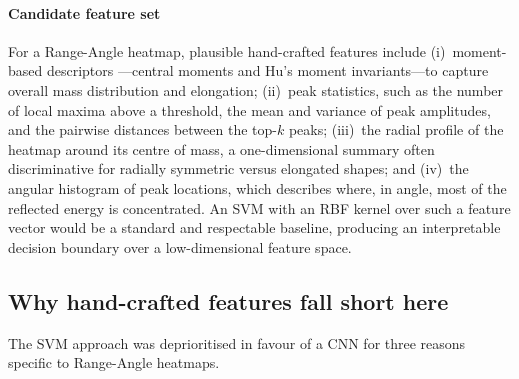 \documentclass[letterpaper,11pt,leqno]{article}
\begin{document}
\paragraph{Candidate feature set} For a Range-Angle heatmap, plausible hand-crafted features include (i)~moment-based descriptors \citep{Hu62}---central moments and Hu's moment invariants---to capture overall mass distribution and elongation; (ii)~peak statistics, such as the number of local maxima above a threshold, the mean and variance of peak amplitudes, and the pairwise distances between the top-$k$ peaks; (iii)~the radial profile of the heatmap around its centre of mass, a one-dimensional summary often discriminative for radially symmetric versus elongated shapes; and (iv)~the angular histogram of peak locations, which describes where, in angle, most of the reflected energy is concentrated. An SVM with an RBF kernel over such a feature vector would be a standard and respectable baseline, producing an interpretable decision boundary over a low-dimensional feature space.

\subsection{Why hand-crafted features fall short here}

The SVM approach was deprioritised in favour of a CNN for three reasons specific to Range-Angle heatmaps.
\end{document}
